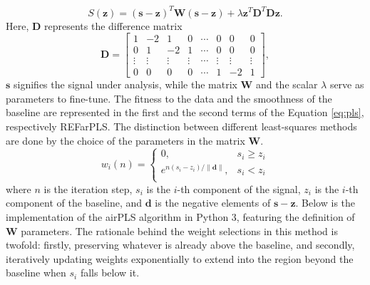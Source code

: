 \documentclass{article}
\begin{document}
\begin{equation}
    \label{eq:pls}
    S(\mathbf{z}) = (\mathbf{s} - \mathbf{z})^T \mathbf{W}(\mathbf{s} - \mathbf{z}) + \lambda \mathbf{z}^T\mathbf{D}^T\mathbf{D}\mathbf{z}.
\end{equation}
Here, $\mathbf{D}$ represents the difference matrix
\begin{equation*}
    \mathbf{D} = \begin{bmatrix}
        1 & -2 & 1 & 0 & \cdots & 0 & 0 & 0 \\
        0 & 1 & -2 & 1 & \cdots & 0 & 0 & 0 \\
        \vdots & \vdots & \vdots & \vdots & \cdots & \vdots & \vdots & \vdots \\
        0 & 0 & 0 & 0 & \cdots & 1 & -2 & 1 
    \end{bmatrix},
\end{equation*}
$\mathbf{s}$ signifies the signal under analysis, while the matrix $\mathbf{W}$ and the scalar $\lambda$ serve as parameters to fine-tune.
The fitness to the data and the smoothness of the baseline are represented in the first and the second terms of the Equation \ref{eq:pls}, respectively REFarPLS.
The distinction between different least-squares methods are done by the choice of the parameters in the matrix $\mathbf{W}$.
\begin{equation*}
    w_i(n) = \begin{cases}
        0, &  s_i \geq z_i \\
        e^{n(s_i - z_i)/\| \mathbf{d} \|}, &  s_i < z_i\\
    \end{cases}
\end{equation*}
where $n$ is the iteration step, $s_i$ is the $i$-th component of the signal, $z_i$ is the $i$-th component of the baseline, and $\mathbf{d}$ is the negative elements of $\mathbf{s} - \mathbf{z}$.
Below is the implementation of the airPLS algorithm in Python 3, featuring the definition of $\mathbf{W}$ parameters.
The rationale behind the weight selections in this method is twofold: firstly, preserving whatever is already above the baseline, and secondly, iteratively updating weights exponentially to extend into the region beyond the baseline when $s_i$ falls below it.
\end{document}
